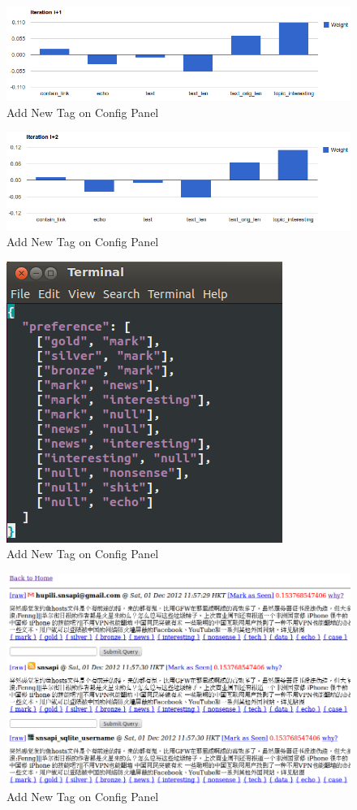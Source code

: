 \documentclass{sig-alternate}
\begin{document}
\begin{figure}[h!]
	\centering
	\includegraphics[width=0.7\linewidth]{../pic/echo_gd_i1.png}
	\caption{Add New Tag on Config Panel}
\end{figure}

\begin{figure}[h!]
	\centering
	\includegraphics[width=0.7\linewidth]{../pic/echo_gd_i2.png}
	\caption{Add New Tag on Config Panel}
\end{figure}

\begin{figure}[h!]
	\centering
	\includegraphics[width=0.7\linewidth]{../pic/echo_preference.png}
	\caption{Add New Tag on Config Panel}
\end{figure}

\begin{figure}[h!]
	\centering
	\includegraphics[width=0.7\linewidth]{../pic/echo_ranked_timeline_before.png}
	\caption{Add New Tag on Config Panel}
\end{figure}
\end{document}
